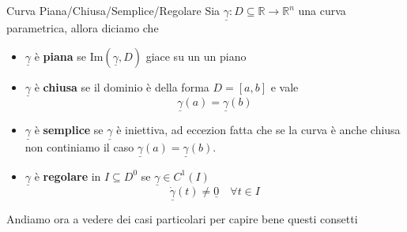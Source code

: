 \documentclass{rapport}
\begin{document}
\begin{definizione}{Curva Piana/Chiusa/Semplice/Regolare}{}
  Sia  $\underline{\gamma}: D \subseteq \mathbb{R}\to \mathbb{R}^n$ una curva parametrica, allora diciamo che 
  \begin{itemize}
    \item $\underline{\gamma}$ è \textbf{piana} se $\text{Im}(\underline{\gamma}, D)$ giace su un un piano 
    \item $\underline{\gamma}$ è \textbf{chiusa} se il dominio è della forma $D=[a,b]$ e vale
    \[
    \underline{\gamma}(a) = \underline{\gamma}(b)  
    \]
    \item $\underline{\gamma}$ è \textbf{semplice} se $\underline{\gamma}$ è iniettiva, ad eccezion fatta che se la curva è anche chiusa non continiamo il caso $\underline{\gamma}(a)=\underline{\gamma}(b)$.
    \item $\underline{\gamma}$ è \textbf{regolare} in $I\subseteq D^0$ se $\underline{\gamma} \in C^1(I)$
    \[
      \underline{\dot{\gamma}}(t) \ne \underline{0} \quad \forall t \in I
    \]
  \end{itemize}
\end{definizione}

\newpage
Andiamo ora a vedere dei casi particolari per capire bene questi consetti 
\end{document}
